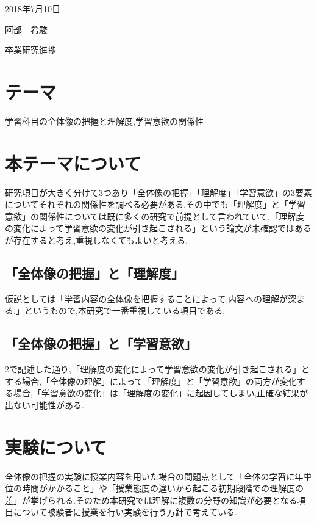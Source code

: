 \documentclass[a4j,10pt]{jsarticle}
\begin{document}
\begin{flushright} %
2018年7月10日

阿部　希駿
\end{flushright}

\begin{center}
\Large{卒業研究進捗}
\end{center}

\section{テーマ}
\label{sec:kihon}
学習科目の全体像の把握と理解度,学習意欲の関係性

\section{本テーマについて}
研究項目が大きく分けて3つあり「全体像の把握」「理解度」「学習意欲」の3要素についてそれぞれの関係性を調べる必要がある.その中でも「理解度」と「学習意欲」の関係性については既に多くの研究で前提として言われていて,「理解度の変化によって学習意欲の変化が引き起こされる」という論文が未確認ではあるが存在すると考え,重視しなくてもよいと考える.

\subsection{「全体像の把握」と「理解度」}
仮説としては「学習内容の全体像を把握することによって,内容への理解が深まる.」というもので,本研究で一番重視している項目である.

\subsection{「全体像の把握」と「学習意欲」}
2で記述した通り,「理解度の変化によって学習意欲の変化が引き起こされる」とする場合,「全体像の理解」によって「理解度」と「学習意欲」の両方が変化する場合,「学習意欲の変化」は「理解度の変化」に起因してしまい,正確な結果が出ない可能性がある.

\section{実験について}
全体像の把握の実験に授業内容を用いた場合の問題点として「全体の学習に年単位の時間がかかること」や「授業態度の違いから起こる初期段階での理解度の差」が挙げられる.そのため本研究では理解に複数の分野の知識が必要となる項目について被験者に授業を行い実験を行う方針で考えている.
\end{document}

